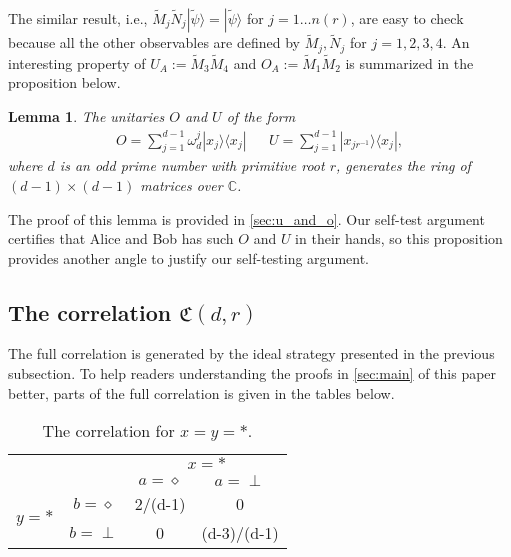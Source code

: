 \documentclass[11pt,letterpaper]{article}
\newcommand{\ket}[1]{|#1\rangle}
\newcommand{\ketbra}[2]{|#1\rangle\langle#2|}
\newcommand{\C}{\mathbb{C}}
\newcommand{\1}{\mathbb{1}}
\newcommand{\tM}{\tilde{M}}
\newcommand{\tN}{\tilde{N}}
\newcommand{\tpsi}{\tilde{\psi}}
\newcommand{\nr}{n(r)}
\newcommand{\fC}{\mathfrak{C}}
\newtheorem{lemma}[theorem]{Lemma}
\theoremstyle{definition}
\begin{document}
The similar result, i.e., $\tM_j\tN_j \ket{\tpsi} = \ket{\tpsi}$ for $j = 1 \dots \nr$, are easy to check because all the other observables are defined by $\tM_j, \tN_j$ for $j=1,2,3,4$.
An interesting property of $U_A := \tM_3\tM_4$ and $O_A := \tM_1\tM_2$ is summarized in the proposition below. 
\begin{lemma}
	\label{lm:uo_independ}
	The unitaries $O$ and $U$ of the form
	\begin{align}
		O = \sum_{j=1}^{d-1} \omega_d^j \ketbra{x_j}{x_j} && U = \sum_{j=1}^{d-1}\ketbra{x_{j r^{-1}}}{x_j},
	\end{align}
	where $d$ is an odd prime number with primitive root $r$, generates
	the ring of $(d-1)\times (d-1)$ matrices over $\C$.
\end{lemma}
The proof of this lemma is provided in \cref{sec:u_and_o}.
Our self-test argument certifies that Alice and Bob has such $O$ and $U$ in their hands, so
this proposition provides another angle to justify our self-testing argument.

\subsection{The correlation $\fC(d,r)$}
The full correlation is generated by the ideal strategy presented in the previous subsection.
To help readers understanding the proofs in \cref{sec:main} of this paper better, 
parts of the full correlation is given in the tables below.
\begin{table}[H]
\begin{center}
\begin{tabular}{|c|c||c|c|}
\hline
\multicolumn{2}{|c|}{} &
\multicolumn{2}{|c|}{$x=\ast$}\\
\cline{3-4}
\multicolumn{2}{|c|}{} &$a = \diamond$ & $a = \perp$ \\
\hline
\hline
\multirow{2}{*}{$y = \ast$} & $b=\diamond$ & 2/(d-1) & 0 \\
\cline{2-4}
&$b=\perp$ & 0 & (d-3)/(d-1) \\
\hline
\end{tabular}
\caption{The correlation for $x=y=\ast$.}
\end{center}
\end{table}
\end{document}

